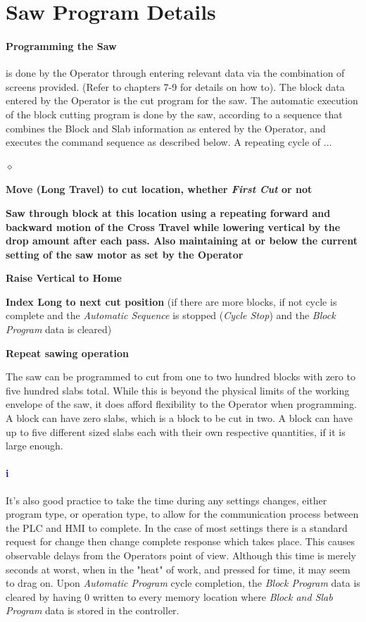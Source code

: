 \section{Saw Program Details}\paragraph*{Programming the Saw} is done by the Operator through entering relevant data via the combination of screens provided. (Refer to chapters 7-9 for details on how to). The block data entered by the Operator is the cut program for the saw. The automatic execution of the block cutting program is done by the saw, according to a sequence that combines the Block and Slab information as entered by the Operator, and executes the command sequence as described below. A repeating cycle of ...
\begin{list}{$\diamond$}{}
	\item \textbf{Move (Long Travel) to cut location, whether \textit{First Cut} or not}
	\item \textbf{Saw through block at this location using a repeating forward and backward motion of the Cross Travel while lowering vertical by the drop amount after each pass. Also maintaining at or below the current setting of the saw motor as set by the Operator}
	\item \textbf{Raise Vertical to Home}
	\item \textbf{Index Long to next cut position} (if there are more blocks, if not cycle is complete and the \textit{Automatic Sequence} is stopped (\textit{Cycle Stop}) and the \textit{Block Program} data is cleared)
	\item \textbf{Repeat sawing operation}
\end{list}
The saw can be programmed to cut from one to two hundred blocks with zero to five hundred slabs total. While this is beyond the physical limits of the working envelope of the saw, it does afford flexibility to the Operator when programming. A block can have zero slabs, which is a block to be cut in two. A block can have up to five different sized slabs each with their own respective quantities, if it is large enough. 
\paragraph{\textbf{\LARGE \textcolor{blue}{i}}}It's also good practice to take the time during any settings changes, either program type, or operation type, to allow for the communication process between the PLC and HMI to complete. In the case of most settings there is a standard request for change then change complete response which takes place. This causes observable delays from the Operators point of view. Although this time is merely seconds at worst, when in the "heat" of work, and pressed for time, it may seem to drag on. Upon \textit{Automatic Program} cycle completion, the \textit{Block Program} data is cleared by having 0 written to every memory location where \textit{Block and Slab Program} data is stored in the controller.
